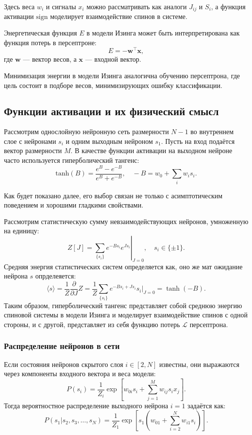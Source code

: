 \begin{description}
	      Здесь веса $w_i$ и сигналы $x_i$ можно рассматривать как аналоги $J_{ij}$ и $S_i$, а функция активации $\mathrm{sign}$ моделирует взаимодействие спинов в системе.

	      Энергетическая функция $E$ в модели Изинга может быть интерпретирована как функция потерь в персептроне:
	      \[
		      E = - \mathbf{w}^\top \mathbf{x},
	      \]
	      где $\mathbf{w}$ — вектор весов, а $\mathbf{x}$ — входной вектор.

	      Минимизация энергии в модели Изинга аналогична обучению персептрона, где цель состоит в подборе весов, минимизирующих ошибку классификации.

	      \subsection{Функции активации и их физический смысл}

	      Рассмотрим однослойную нейронную сеть размерности $N - 1$ во внутреннем слое с нейронами $s_i$ и одним выходным нейроном $s_1$. Пусть на вход подаётся вектор размерности $M$. В качестве функции активации на выходном нейроне часто используется гиперболический тангенс:
	      \[
		      \mathrm{tanh}(B) = \frac{e^{B} - e^{-B}}{e^{B} + e^{-B}}, \quad -B = w_0 + \sum_i w_i s_i.
	      \]

	      Как будет показано далее, его выбор связан не только с асимптотическим поведением и хорошими гладкими свойствами.

	      Рассмотрим статистическую сумму невзаимодействующих нейронов, умноженную на единицу:
	      \[
		      Z[J] = \left.\sum_{\{s_i\}} e^{-B s_i} e^{J s_i} \right|_{J=0}, \quad s_i \in \{\pm 1\}.
	      \]
	      Средняя энергия статистических систем определяется как, оно же мат ожидание нейрона $s$ опрделеяется:
	      \[
		      \langle s \rangle = \frac{1}{Z} \frac{\partial}{\partial J} Z = \frac{1}{Z} \sum_{\{s_i\}} e^{-B s_i + J s_i} s_i \bigg|_{J=0} = \tanh(-B).
	      \]
	      Таким образом, гиперболический тангенс представляет собой среднюю энергию спиновой системы в модели Изинга и моделирует взаимодействие спинов с одной стороны, и с другой, представляет из себя функцию потерь $\mathcal{L}$  персептрона.

	      \subsubsection*{Распределение нейронов в сети}

	      Если состояния нейронов скрытого слоя $i \in [2, N]$ известны, они выражаются через компоненты входного вектора и веса модели:
	      \[
		      P(s_i) = \frac{1}{Z_i} \exp\left[ w_{0i} s_i + \sum_{j=1}^M w_{ij} s_i x_j \right].
	      \]
	      Тогда вероятностное распределение выходного нейрона $i = 1$ задаётся как:
	      \[
		      P(s_1 | s_2, s_3, \dots, s_N) = \frac{1}{Z_1} \exp\left[ s_1 \left( w_{01} + \sum_{i=2}^N w_{i1} s_i \right) \right].
	      \]


\end{description}
